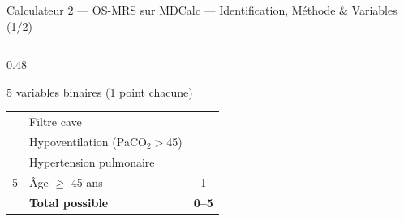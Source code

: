\documentclass[aspectratio=169]{beamer}
\begin{document}
\begin{frame}{Calculateur 2 --- OS-MRS sur MDCalc --- Identification, Méthode \& Variables (1/2)}
\begin{columns}[T]
\begin{column}{0.48\textwidth}
\begin{block}{5 variables binaires (1 point chacune)}
\begin{tabular}{clc}
            & \quad Filtre cave & \\
            & \quad Hypoventilation (PaCO$_2 >$45) & \\
            & \quad Hypertension pulmonaire & \\[3pt]
          5 & Âge $\geq$ 45 ans & 1 \\
          \midrule
          & \textbf{Total possible} & \textbf{0--5} \\
          \bottomrule
        \end{tabular}
      \end{block}
    \end{column}
  \end{columns}
\end{frame}

\end{document}
